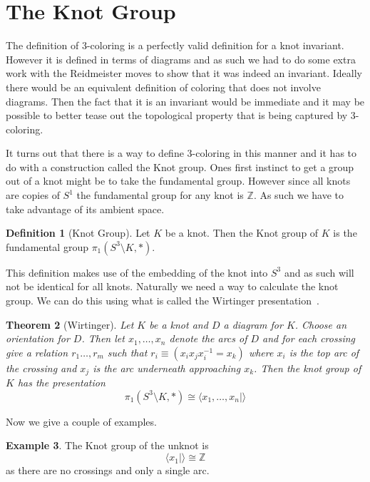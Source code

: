 \documentclass[12pt]{amsart}
\newtheorem{theorem}{Theorem}[section]
\theoremstyle{definition}
\newtheorem{definition}[theorem]{Definition}
\newtheorem{example}[theorem]{Example}
\theoremstyle{remark}
\numberwithin{equation}{section}
\newcommand{\bb}[1]{\mathbb{#1}}
\begin{document}
\section{The Knot Group}
\label{sec:knot-group-d_6}

The definition of 3-coloring is a perfectly valid definition for a knot
invariant. However it is defined in terms of diagrams and as such
we had to do some extra work with the Reidmeister moves to show that it
was indeed an invariant. Ideally there would be an equivalent definition
of coloring that does not involve diagrams. Then the fact that it is
an invariant would be immediate and it may be possible to better tease
out the topological property that is being captured by 3-coloring.

It turns out that there is a way to define 3-coloring in this manner
and it has to do with a construction called the Knot group. Ones first
instinct to get a group out of a knot might be to take the fundamental
group. However since all knots are copies of $S^1$ the fundamental group
for any knot is $\bb{Z}$. As such we have to take advantage of its
ambient space.

\begin{definition}[Knot Group]
  Let $K$ be a knot. Then the Knot group of $K$ is the fundamental
  group $\pi_1(S^3\setminus K,*)$.
\end{definition}

This definition makes use of the embedding of the knot into $S^3$ and
as such will not be identical for all knots. Naturally we need a way
to calculate the knot group. We can do this using what is called
the Wirtinger presentation~\cite{hatcher}.

\begin{theorem}[Wirtinger]
  Let $K$ be a knot and $D$ a diagram for $K$. Choose an
  orientation for $D$. Then let $x_1,\ldots,x_n$
  denote the arcs of $D$ and for each crossing give a relation
  $r_1\ldots, r_m$ such that $r_i \equiv (x_ix_jx_i^{-1}=x_k)$ where $x_i$ is
  the top arc of the crossing and $x_j$ is the arc underneath approaching
  $x_k$. Then the knot group of $K$ has the presentation
  \[
    \pi_1(S^3\setminus K,*)\cong \langle x_1,\ldots, x_n| \rangle
  \]
\end{theorem}

Now we give a couple of examples.

\begin{example}
  The Knot group of the unknot is
  \[
    \langle x_1 |\rangle \cong \bb{Z}
  \]
  as there are no crossings and only a single arc.
\end{example}
\end{document}
